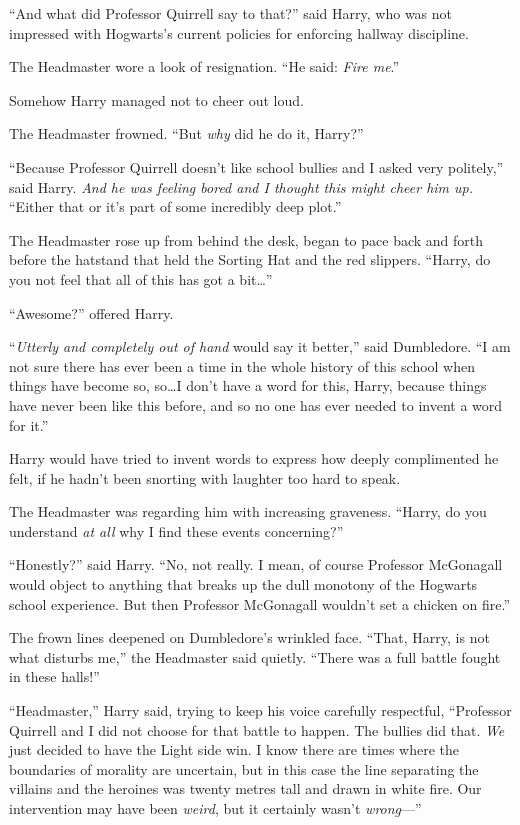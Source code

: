 “And what did Professor Quirrell say to that?” said Harry, who was not impressed with Hogwarts’s current policies for enforcing hallway discipline.

The Headmaster wore a look of resignation. “He said: \emph{Fire me}.”

Somehow Harry managed not to cheer out loud.

The Headmaster frowned. “But \emph{why} did he do it, Harry?”

“Because Professor Quirrell doesn’t like school bullies and I asked very politely,” said Harry. \emph{And he was feeling bored and I thought this might cheer him up.} “Either that or it’s part of some incredibly deep plot.”

The Headmaster rose up from behind the desk, began to pace back and forth before the hatstand that held the Sorting Hat and the red slippers. “Harry, do you not feel that all of this has got a bit…”

“Awesome?” offered Harry.

“\emph{Utterly and completely out of hand} would say it better,” said Dumbledore. “I am not sure there has ever been a time in the whole history of this school when things have become so, so…I don’t have a word for this, Harry, because things have never been like this before, and so no one has ever needed to invent a word for it.”

Harry would have tried to invent words to express how deeply complimented he felt, if he hadn’t been snorting with laughter too hard to speak.

The Headmaster was regarding him with increasing graveness. “Harry, do you understand \emph{at all} why I find these events concerning?”

“Honestly?” said Harry. “No, not really. I mean, of course Professor McGonagall would object to anything that breaks up the dull monotony of the Hogwarts school experience. But then Professor McGonagall wouldn’t set a chicken on fire.”

The frown lines deepened on Dumbledore’s wrinkled face. “That, Harry, is not what disturbs me,” the Headmaster said quietly. “There was a full battle fought in these halls!”

“Headmaster,” Harry said, trying to keep his voice carefully respectful, “Professor Quirrell and I did not choose for that battle to happen. The bullies did that. \emph{We} just decided to have the Light side win. I know there are times where the boundaries of morality are uncertain, but in this case the line separating the villains and the heroines was twenty metres tall and drawn in white fire. Our intervention may have been \emph{weird}, but it certainly wasn’t \emph{wrong}—”

